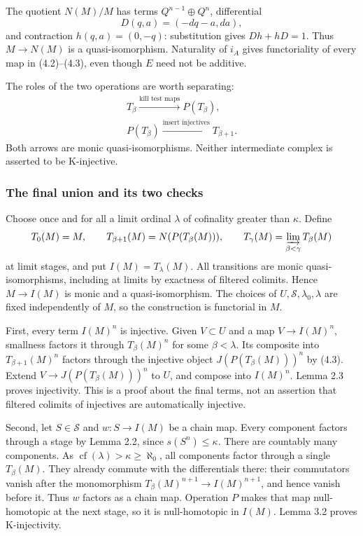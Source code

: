 \documentclass[
  english,
  11pt,
  a4paper,
]{article}
\begin{document}
The quotient \(N(M)/M\) has terms \(Q^{n-1}\oplus Q^n\), differential
\[D(q,a)=(-dq-a,da),\] and contraction \(h(q,a)=(0,-q)\): substitution
gives \(Dh+hD=1\). Thus \(M\to N(M)\) is a quasi-isomorphism. Naturality
of \(i_A\) gives functoriality of every map in (4.2)--(4.3), even though
\(E\) need not be additive.

The roles of the two operations are worth separating: \[\begin{gathered}
T_\beta\xrightarrow{\text{kill test maps}}P(T_\beta),\\
P(T_\beta)\xrightarrow{\text{insert injectives}}T_{\beta+1}.
\end{gathered}
\tag{4.4}\] Both arrows are monic quasi-isomorphisms. Neither
intermediate complex is asserted to be K-injective.

\subsubsection{The final union and its two
checks}\label{k-injective-resolutions-in-grothendieck-categories--the-final-union-and-its-two-checks}

Choose once and for all a limit ordinal \(\lambda\) of cofinality
greater than \(\kappa\). Define \[T_0(M)=M,\qquad
T_{\beta+1}(M)=N(P(T_\beta(M))),\qquad
T_\gamma(M)=\varinjlim_{\beta<\gamma}T_\beta(M)\] at limit stages, and
put \(I(M)=T_\lambda(M)\). All transitions are monic quasi-isomorphisms,
including at limits by exactness of filtered colimits. Hence
\(M\to I(M)\) is monic and a quasi-isomorphism. The choices of
\(U,\mathscr S,\lambda_0,\lambda\) are fixed independently of \(M\), so
the construction is functorial in \(M\).

First, every term \(I(M)^n\) is injective. Given \(V\subset U\) and a
map \(V\to I(M)^n\), smallness factors it through \(T_\beta(M)^n\) for
some \(\beta<\lambda\). Its composite into \(T_{\beta+1}(M)^n\) factors
through the injective object \(J(P(T_\beta(M)))^n\) by (4.3). Extend
\(V\to J(P(T_\beta(M)))^n\) to \(U\), and compose into \(I(M)^n\). Lemma
2.3 proves injectivity. This is a proof about the final terms, not an
assertion that filtered colimits of injectives are automatically
injective.

Second, let \(S\in\mathscr S\) and \(w:S\to I(M)\) be a chain map. Every
component factors through a stage by Lemma 2.2, since
\(s(S^n)\leq\kappa\). There are countably many components. As
\(\operatorname{cf}(\lambda)>\kappa\geq\aleph_0\), all components factor
through a single \(T_\beta(M)\). They already commute with the
differentials there: their commutators vanish after the monomorphism
\(T_\beta(M)^{n+1}\to I(M)^{n+1}\), and hence vanish before it. Thus
\(w\) factors as a chain map. Operation \(P\) makes that map
null-homotopic at the next stage, so it is null-homotopic in \(I(M)\).
Lemma 3.2 proves K-injectivity.
\end{document}
